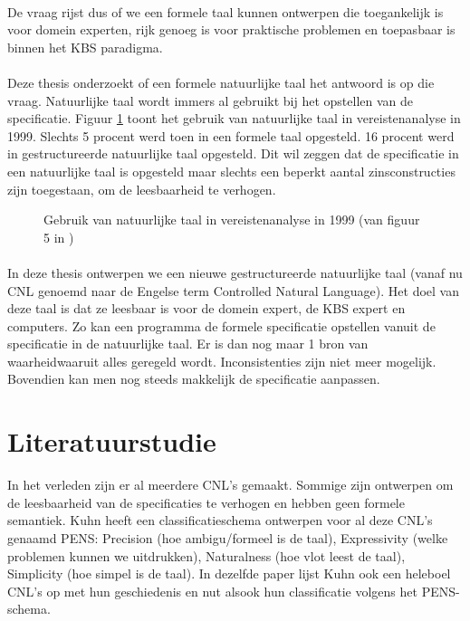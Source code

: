 \documentclass[]{article}
\theoremstyle{definition}
\begin{document}
\paragraph{} De vraag rijst dus of we een formele taal kunnen ontwerpen die toegankelijk is voor domein experten, rijk genoeg is voor praktische problemen en toepasbaar is binnen het KBS paradigma.

\paragraph{} Deze thesis onderzoekt of een formele natuurlijke taal het antwoord is op die vraag. Natuurlijke taal wordt immers al gebruikt bij het opstellen van de specificatie. Figuur \ref{fig:natural-language-use} toont het gebruik van natuurlijke taal in vereistenanalyse in 1999. Slechts 5 procent werd toen in een formele taal opgesteld. 16 procent werd in gestructureerde natuurlijke taal opgesteld. Dit wil zeggen dat de specificatie in een natuurlijke taal is opgesteld maar slechts een beperkt aantal zinsconstructies zijn toegestaan, om de leesbaarheid te verhogen.

\begin{figure}
  \label{fig:natural-language-use}
  \caption{Gebruik van natuurlijke taal in vereistenanalyse in 1999 (van figuur 5 in \cite{Luisa2004})}
\end{figure}

\paragraph{} In deze thesis ontwerpen we een nieuwe gestructureerde natuurlijke taal (vanaf nu CNL genoemd naar de Engelse term Controlled Natural Language). Het doel van deze taal is dat ze leesbaar is voor de domein expert, de KBS expert en computers. Zo kan een programma de formele specificatie opstellen vanuit de specificatie in de natuurlijke taal. Er is dan nog maar 1 bron van waarheidwaaruit alles geregeld wordt. Inconsistenties zijn niet meer mogelijk. Bovendien kan men nog steeds makkelijk de specificatie aanpassen.

\section{Literatuurstudie}
In het verleden zijn er al meerdere CNL's gemaakt. Sommige zijn ontwerpen om de leesbaarheid van de specificaties te verhogen en hebben geen formele semantiek. Kuhn heeft een classificatieschema ontwerpen voor al deze CNL's \cite{Kuhn2014} genaamd PENS: Precision (hoe ambigu/formeel is de taal), Expressivity (welke problemen kunnen we uitdrukken), Naturalness (hoe vlot leest de taal), Simplicity (hoe simpel is de taal). In dezelfde paper lijst Kuhn ook een heleboel CNL's op met hun geschiedenis en nut alsook hun classificatie volgens het PENS-schema.
\end{document}
